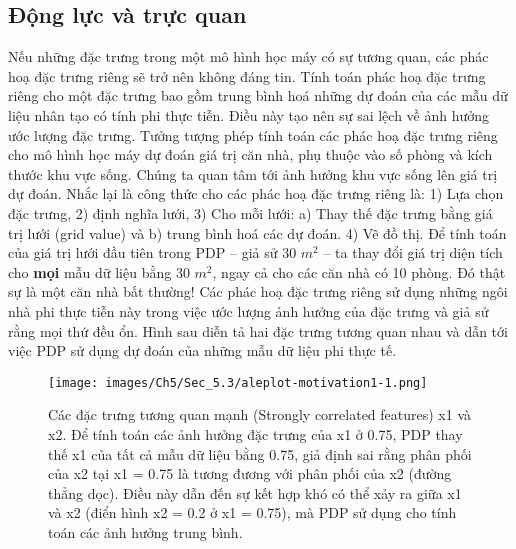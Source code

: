 \subsection{Động lực và trực quan}
Nếu những đặc trưng trong một mô hình học máy có sự tương quan, các phác hoạ đặc trưng riêng sẽ trở nên không đáng tin. Tính toán phác hoạ đặc trưng riêng cho một đặc trưng bao gồm trung bình hoá những dự đoán của các mẫu dữ liệu nhân tạo có tính phi thực tiễn. Điều này tạo nên sự sai lệch về ảnh hưởng ước lượng đặc trưng. Tưởng tượng phép tính toán các phác hoạ đặc trưng riêng cho mô hình học máy dự đoán giá trị căn nhà, phụ thuộc vào số phòng và kích thước khu vực sống. Chúng ta quan tâm tới ảnh hưởng khu vực sống lên giá trị dự đoán. Nhắc lại là công thức cho các phác hoạ đặc trưng riêng là: 1) Lựa chọn đặc trưng, 2) định nghĩa lưới, 3) Cho mỗi lưới: a) Thay thế đặc trưng bằng giá trị lưới (grid value) và b) trung bình hoá các dự đoán. 4) Vẽ đồ thị. Để tính toán của giá trị lưới đầu tiên trong PDP – giả sử 30 $m^2$ – ta thay đổi giá trị diện tích cho \textbf{mọi} mẫu dữ liệu bằng 30 $m^2$, ngay cả cho các căn nhà có 10 phòng. Đó thật sự là một căn nhà bất thường! Các phác hoạ đặc trưng riêng sử dụng những ngôi nhà phi thực tiễn này trong việc ước lượng ảnh hưởng của đặc trưng và giả sử rằng mọi thứ đều ổn. Hình sau diễn tả hai đặc trưng tương quan nhau và dẫn tới việc PDP sử dụng dự đoán của những mẫu dữ liệu phi thực tế.

\begin{figure*}[h!]
	\centering
	\texttt{[image: images/Ch5/Sec\_5.3/aleplot-motivation1-1.png]}
	\label{fig:5_10}
	\caption{Các đặc trưng tương quan mạnh (Strongly correlated features) x1 và x2. Để tính toán các ảnh hưởng đặc trưng của x1 ở 0.75, PDP thay thế x1 của tất cả mẫu dữ liệu bằng 0.75, giả định sai rằng phân phối của x2 tại x1 = 0.75 là tương đương với phân phối của x2 (đường thẳng dọc). Điều này dẫn đến sự kết hợp khó có thể xảy ra giữa x1 và x2 (điển hình x2 = 0.2 ở x1 = 0.75), mà PDP sử dụng cho tính toán các ảnh hưởng trung bình.}
\end{figure*}

